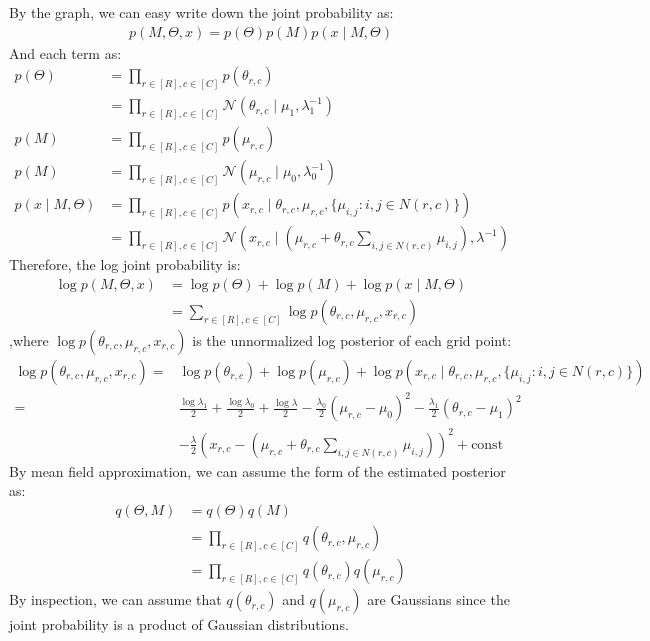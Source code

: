 \documentclass[12pt]{article}
\newenvironment{problem}[2][Problem]{\begin{trivlist}
\item[\hskip \labelsep {\bfseries #1}\hskip \labelsep {\bfseries #2.}]}{\end{trivlist}}
\begin{document}
\begin{problem}{2.9.25}
By the graph, we can easy write down the joint probability as:
\begin{align*}
    p(M, \Theta, x) = p(\Theta)p(M)p(x \mid M, \Theta)
\end{align*}
And each term as:
\begin{align*}
    p(\Theta) &= \prod_{r \in [R], c\in [C]} p(\theta_{r,c}) \\
        &= \prod_{r \in [R], c\in [C]} \mathcal{N}(\theta_{r,c}\mid \mu_{1}, \lambda_{1}^{-1}) \\
    p(M) &= \prod_{r \in [R], c\in [C]} p(\mu_{r,c}) \\
    p(M) &= \prod_{r \in [R], c\in [C]} \mathcal{N}(\mu_{r,c}\mid \mu_{0}, \lambda_{0}^{-1}) \\
    p(x \mid M, \Theta) &= \prod_{r \in [R], c\in [C]} 
                p(x_{r,c}\mid \theta_{r,c}, \mu_{r,c}, \{\mu_{i,j}: i, j \in N(r,c)\})\\
        &= \prod_{r \in [R], c\in [C]} \mathcal{N}(x_{r,c} \mid  
            (\mu_{r,c} + \theta_{r,c}\sum_{i,j \in N(r,c)}\mu_{i,j}), \lambda^{-1})
\end{align*}
Therefore, the log joint probability is:
\begin{align*}
    \log p(M, \Theta, x) &= \log p(\Theta) + \log p(M) + \log p(x \mid M, \Theta) \\
        & = \sum_{r \in [R], c\in [C]} \log p(\theta_{r,c}, \mu_{r,c}, x_{r,c})
\end{align*}
,where $\log p(\theta_{r,c}, \mu_{r,c}, x_{r,c})$ is the unnormalized log posterior
of each grid point:
\begin{align*}
    \log p(\theta_{r,c}, \mu_{r,c}, x_{r,c}) =& 
    \log p(\theta_{r,c}) + \log p(\mu_{r,c}) 
        + \log p(x_{r,c}\mid \theta_{r,c}, \mu_{r,c}, \{\mu_{i,j}: i, j \in N(r,c)\}) \\
    =& \frac{\log \lambda_1}{2} + \frac{\log \lambda_0}{2} + \frac{\log \lambda}{2} 
       - \frac{\lambda_0}{2}(\mu_{r,c} - \mu_0)^2 - \frac{\lambda_1}{2}(\theta_{r,c} - \mu_1)^2 \\
     & - \frac{\lambda}{2}(x_{r,c} - (\mu_{r,c} + \theta_{r,c}\sum_{i,j \in N(r,c)}\mu_{i,j}))^2 + \text{const}
\end{align*}
By mean field approximation, we can assume the form of the estimated posterior as:
\begin{align*}
    q(\Theta, M) &= q(\Theta)q(M) \\
                 &= \prod_{r \in [R], c\in [C]} q(\theta_{r,c}, \mu_{r,c}) \\
                 &= \prod_{r \in [R], c\in [C]} q(\theta_{r,c})q(\mu_{r,c})
\end{align*}
By inspection, we can assume that $q(\theta_{r,c})$ and $q(\mu_{r,c})$ are Gaussians
since the joint probability is a product of Gaussian distributions.


\end{problem}
\end{document}
